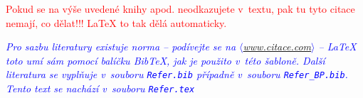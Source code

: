 ﻿\textcolor{red}{Pokud se na výše uvedené knihy apod. neodkazujete v~textu, pak tu tyto citace nemají, co dělat!!! \LaTeX\/ to tak dělá automaticky.}

\textcolor{blue}{\em Pro sazbu literatury existuje norma -- podívejte se na $\langle$\href{www.citace.com}{www.citace.com}$\rangle$ --
\LaTeX\/ toto umí sám pomocí balíčku BibTeX, jak je použito v~této šabloně. Další literatura se vyplňuje v~souboru \texttt{\cestaStyles Refer.bib} případně v~souboru \texttt{\cestaStyles Refer\_BP.bib}. Tento text se nachází v~souboru \texttt{\cestaStyles Refer.tex}} 
